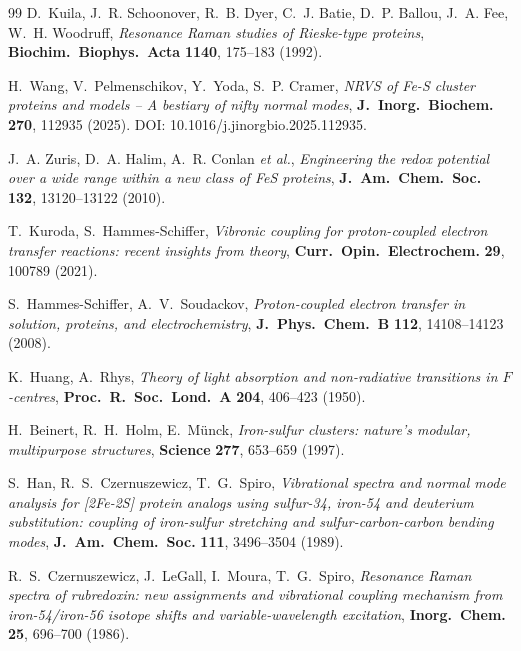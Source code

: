 \documentclass[11pt,a4paper,twoside]{article}
\theoremstyle{remark}
\begin{document}
\begin{thebibliography}{99}
D.~Kuila, J.~R. Schoonover, R.~B. Dyer, C.~J. Batie, D.~P. Ballou,
J.~A. Fee, W.~H. Woodruff,
\emph{Resonance {R}aman studies of {R}ieske-type proteins},
\textbf{Biochim.\ Biophys.\ Acta} \textbf{1140}, 175--183 (1992).

H.~Wang, V.~Pelmenschikov, Y.~Yoda, S.~P. Cramer,
\emph{NRVS of {Fe-S} cluster proteins and models -- A bestiary of
nifty normal modes},
\textbf{J.\ Inorg.\ Biochem.} \textbf{270}, 112935 (2025).
DOI: 10.1016/j.jinorgbio.2025.112935.

J.~A. Zuris, D.~A. Halim, A.~R. Conlan \emph{et al.},
\emph{Engineering the redox potential over a wide range within a
new class of FeS proteins},
\textbf{J.\ Am.\ Chem.\ Soc.} \textbf{132}, 13120--13122 (2010).

T.~Kuroda, S.~Hammes-Schiffer,
\emph{Vibronic coupling for proton-coupled electron transfer reactions:
recent insights from theory},
\textbf{Curr.\ Opin.\ Electrochem.} \textbf{29}, 100789 (2021).


S.~Hammes-Schiffer, A.~V.~Soudackov,
\emph{Proton-coupled electron transfer in solution, proteins, and
electrochemistry},
\textbf{J.\ Phys.\ Chem.\ B} \textbf{112}, 14108--14123 (2008).

K.~Huang, A.~Rhys,
\emph{Theory of light absorption and non-radiative transitions in
$F$-centres},
\textbf{Proc.\ R.\ Soc.\ Lond.\ A} \textbf{204}, 406--423 (1950).

H.~Beinert, R.~H.~Holm, E.~M\"unck,
\emph{Iron-sulfur clusters: nature's modular, multipurpose structures},
\textbf{Science} \textbf{277}, 653--659 (1997).

S.~Han, R.~S.~Czernuszewicz, T.~G.~Spiro,
\emph{Vibrational spectra and normal mode analysis for {[}2Fe-2S{]}
protein analogs using sulfur-34, iron-54 and deuterium substitution:
coupling of iron-sulfur stretching and sulfur-carbon-carbon bending modes},
\textbf{J.\ Am.\ Chem.\ Soc.} \textbf{111}, 3496--3504 (1989).

R.~S.~Czernuszewicz, J.~LeGall, I.~Moura, T.~G.~Spiro,
\emph{Resonance Raman spectra of rubredoxin: new assignments and
vibrational coupling mechanism from iron-54/iron-56 isotope shifts
and variable-wavelength excitation},
\textbf{Inorg.\ Chem.} \textbf{25}, 696--700 (1986).


\end{thebibliography}
\end{document}
